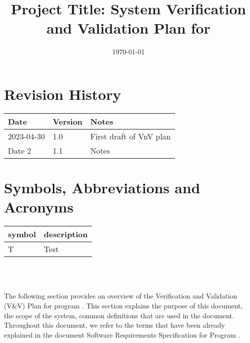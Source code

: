 \documentclass[12pt, titlepage]{article}
\begin{document}
\title{Project Title: System Verification and Validation Plan for \progname{}} 
\author{\authname}
\date{\today}
	
\maketitle


\section{Revision History}

\begin{tabularx}{\textwidth}{p{3cm}p{2cm}X}
\toprule {\bf Date} & {\bf Version} & {\bf Notes}\\
\midrule
2023-04-30 & 1.0 & First draft of VnV plan\\
Date 2 & 1.1 & Notes\\
\bottomrule
\end{tabularx}

\newpage

\tableofcontents

%

\newpage
\section{Symbols, Abbreviations and Acronyms}

\renewcommand{\arraystretch}{1.2}
\begin{tabular}{l l} 
  \toprule		
  \textbf{symbol} & \textbf{description}\\
  \midrule 
  T & Test\\
  \bottomrule
\end{tabular}\\ \\

\noindent \citep{SRS}

\newpage




\noindent The following section provides an overview of the Verification and Validation (V\&V) Plan
for program \progname. This section explains the purpose of this document, the scope of the
system, common definitions that are used in the document. Throughout this document, we refer to the terms that have been already explained in
the document Software Requirements Specification for Program \progname.
\end{document}
